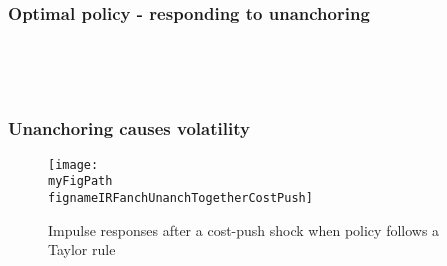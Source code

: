 \documentclass[10pt]{beamer}
\def \myFigPath {../../../figures/}
\def\fignameDiDpibar{analyze_opt_policy_ip18_Oct_2020} %
\def\fignameHistPib{analyze_opt_policy_hist_pib_18_Oct_2020}
\def\fignameIRFanchUnanchTogetherCostPush{RIR_together_psi_pi1_5_command_IRFs_approx_pretty_2020_10_25}
\begin{document}
\begin{frame}
	\frametitle{Optimal policy - responding to unanchoring }
	
\begin{figure}[h!]
\footnotesize
\end{figure} 

\



 
 \



\end{frame}

\begin{frame}
	\frametitle{Unanchoring causes volatility}\label{IRF1}

\begin{figure}[h!]
\texttt{[image: \\myFigPath \\fignameIRFanchUnanchTogetherCostPush]}
\caption{Impulse responses after a cost-push shock when policy follows a Taylor rule}
\label{IRF}
\end{figure}	

\vfill
\vspace{-0.9cm}
\hfill \hyperlink{oscillatory}{}
\end{frame}
%
\end{document}
